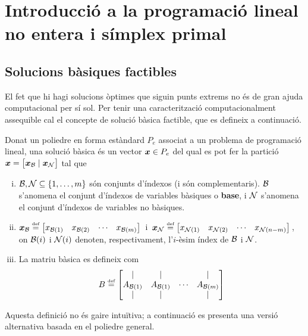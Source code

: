 \chapter[Introducció a la prog. lineal \& símplex primal]%
{Introducció a la programació lineal no entera i símplex primal}

\section{Solucions bàsiques factibles}

El fet que hi hagi solucions òptimes que siguin punts extrems no és de gran ajuda computacional per sí sol. Per tenir una caracterització computacionalment assequible cal el concepte de solució bàsica factible, que es defineix a continuació.

\begin{defi}
	Donat un poliedre en forma estàndard $P_e$ associat a un problema de programació lineal, una solució bàsica és un vector $\boldsymbol{x}\in P_e$ del qual es pot fer la partició $\boldsymbol{x} = \left[\boldsymbol{x}_{\mathcal{B}}\mid\boldsymbol{x}_{\mathcal{N}}\right]$ tal que
	\begin{enumerate}[i)]
		\item $\mathcal{B},\mathcal{N}\subseteq\{1,\ldots,m \}$ són conjunts d'índexos (i són complementaris). $\mathcal{B}$ s'anomena el conjunt d'índexos de variables bàsiques o \textbf{base}, i $\mathcal{N}$ s'anomena el conjunt d'índexos de variables no bàsiques.
		\item $\boldsymbol{x}_{\mathcal{B}} \stackrel{\text{\tiny def}}{=} 
		\begin{bmatrix}x_{\mathcal{B}(1)} & x_{\mathcal{B}(2)} & \cdots & x_{\mathcal{B}(m)}\end{bmatrix}\,$
		i
		$\,\boldsymbol{x}_{\mathcal{N}} \stackrel{\text{\tiny def}}{=} 
		\begin{bmatrix}x_{\mathcal{N}(1)} & x_{\mathcal{N}(2)} & \cdots & x_{\mathcal{N}(n-m)}\end{bmatrix}\,$, on $\mathcal{B}(i)$ i $\mathcal{N}(i)$ denoten, respectivament, l'$i$-èsim índex de $\mathcal{B}$ i $\mathcal{N}$.
		\item La matriu bàsica es defineix com 
		\[
			B \stackrel{\text{\tiny def}}{=}
			\begin{bmatrix}
			\arrowvert& 	\arrowvert& 	  & 	\arrowvert\\
			A_{\mathcal{B}(1)}&		A_{\mathcal{B}(1)}&	\cdots&		A_{\mathcal{B}(m)}\\
			\arrowvert& 	\arrowvert& 	  & 	\arrowvert\\
			\end{bmatrix}
		\]
	\end{enumerate}
\end{defi}

Aquesta definició no és gaire intuïtiva; a continuació es presenta una versió alternativa basada en el poliedre general.

